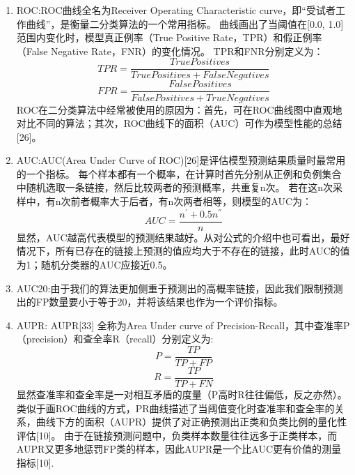 \begin{enumerate}
    \item ROC:ROC曲线全名为Receiver Operating Characteristic curve，即“受试者工作曲线”，是衡量二分类算法的一个常用指标。
    曲线画出了当阈值在[0.0, 1.0]范围内变化时，模型真正例率（True Positive Rate，TPR）和假正例率（False Negative Rate，FNR）的变化情况。
    TPR和FNR分别定义为：
    \[ TPR = \frac{True Positives}{True Positives + False Negatives} \]
    \[ FPR = \frac{False Positives}{False Positives + True Negatives} \]
    ROC在二分类算法中经常被使用的原因为：首先，可在ROC曲线图中直观地对比不同的算法；其次，ROC曲线下的面积（AUC）可作为模型性能的总结[26]。
    \item AUC:AUC(Area Under Curve of ROC)[26]是评估模型预测结果质量时最常用的一个指标。
    每个样本都有一个概率，在计算时首先分别从正例和负例集合中随机选取一条链接，然后比较两者的预测概率，共重复n次。
    若在这n次采样中，有n次前者概率大于后者，有n次两者相等，则模型的AUC为：
    \[AUC=\frac{n^{'}+0.5n^{''}}{n}\]
    显然，AUC越高代表模型的预测结果越好。从对公式的介绍中也可看出，最好情况下，所有已存在的链接上预测的值应均大于不存在的链接，此时AUC的值为1；随机分类器的AUC应接近0.5。
    \item AUC20:由于我们的算法更加侧重于预测出的高概率链接，因此我们限制预测出的FP数量要小于等于20，并将该结果也作为一个评价指标。
    \item AUPR: AUPR[33] 全称为Area Under curve of Precision-Recall，其中查准率P（precision）和查全率R（recall）分别定义为:
    \[P=\frac{TP}{TP+FP}\] \[R=\frac{TP}{TP+FN}\]
    显然查准率和查全率是一对相互矛盾的度量（P高时R往往偏低，反之亦然）。
    类似于画ROC曲线的方式，PR曲线描述了当阈值变化时查准率和查全率的关系，曲线下方的面积（AUPR）提供了对正确预测出正类和负类比例的量化性评估[10]。
    由于在链接预测问题中，负类样本数量往往远多于正类样本，而AUPR又更多地惩罚FP类的样本，因此AUPR是一个比AUC更有价值的测量指标[10].
\end{enumerate}



